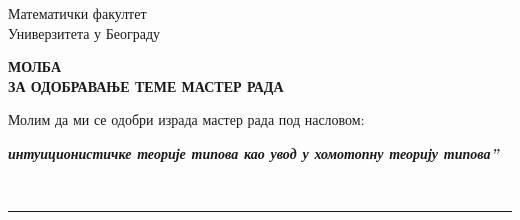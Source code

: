 \documentclass[a4paper]{article}
\def\zn{,\kern-0.09em,}
\begin{document}
\thispagestyle{empty}

\begin{flushleft}
Математички факултет\\
Универзитета у Београду
\end{flushleft}

\bigskip%

\begin{center}
\textbf{МОЛБА\\
ЗА ОДОБРАВАЊЕ ТЕМЕ МАСТЕР РАДА
}\end{center}

\bigskip%

\begin{flushleft}
Молим да ми се одобри израда мастер рада под насловом:
\end{flushleft}

\begin{minipage}{16.5cm}
\textbf{\textit{ интуиционистичке теорије типова као увод у хомотопну теорију типова''}}
\end{minipage}\\
\rule[4mm]{17.5cm}{.05mm}
\end{document}
